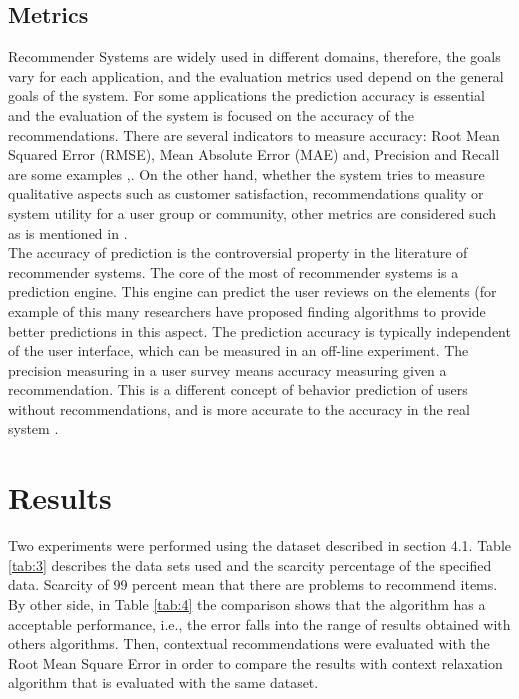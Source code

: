 \subsection{Metrics} \label{sec:4.2}

Recommender Systems are widely used in different domains, therefore, the goals
vary for each application, and the evaluation metrics used depend on the general
goals of the system. For some applications the prediction accuracy is essential
and the evaluation of the system is focused on the accuracy of the
recommendations. There are several indicators to measure accuracy: Root Mean
Squared Error (RMSE), Mean Absolute Error (MAE) and, Precision and Recall are
some examples \cite{ricci2011introduction},\cite{campochiaro2009metrics}. On the
other hand, whether the system tries to measure qualitative aspects such as
customer satisfaction, recommendations quality or system utility for a user
group or community, other metrics are considered such as is mentioned in
\cite{campochiaro2009metrics}. \\ The accuracy of prediction is the
controversial property in the literature of recommender systems. The core of the
most of recommender systems is a prediction engine. This engine can predict the
user reviews on the elements (for example of this many researchers have proposed
finding algorithms to provide better predictions in this aspect. The prediction
accuracy is typically independent of the user interface, which can be measured
in an off-line experiment. The precision measuring in a user survey means
accuracy measuring given a recommendation. This is a different concept of
behavior prediction of users without recommendations, and is more accurate
to the accuracy in the real system \cite{ricci2011introduction}.


\section{Results} \label{sec:5}

Two experiments were performed using the dataset described in section 4.1. Table
\ref{tab:3} describes the data sets used and the scarcity percentage of the
specified data. Scarcity of 99 percent mean that there are problems to recommend
items.  \\ By other side, in Table \ref{tab:4} the comparison shows that the
algorithm has a acceptable performance, i.e., the  error falls into the range
of results obtained with others algorithms. Then, contextual recommendations
were evaluated with the Root Mean Square Error in  order to compare the results
with context relaxation algorithm \cite{zheng2012differential} that is evaluated
with the same dataset.

